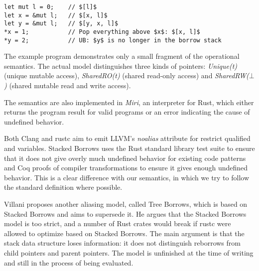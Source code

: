 \begin{code}
\begin{verbatim}
let mut l = 0;    // $[l]$
let x = &mut l;   // $[x, l]$
let y = &mut l;   // $[y, x, l]$
*x = 1;           // Pop everything above $x$: $[x, l]$
*y = 2;           // UB: $y$ is no longer in the borrow stack
\end{verbatim}
\end{code}    

The example program demonstrates only a small fragment of the operational semantics.
The actual model distinguishes three kinds of pointers: \textit{Unique(t)} (unique mutable access), \textit{SharedRO(t)} (shared read-only access)
and \textit{SharedRW($\bot$)} (shared mutable read and write access).

The semantics are also implemented in \textit{Miri}, an interpreter for Rust, which either returns
the program result for valid programs or an error indicating the cause of undefined behavior.

Both Clang and rustc aim to emit LLVM's \textit{noalias}
attribute for restrict qualified and  variables.
Stacked Borrows uses the Rust standard library test suite to ensure that it does not give overly much undefined behavior
for existing code patterns and Coq proofs of compiler transformations to ensure it gives enough undefined behavior.
This is a clear difference with our semantics, in which we try to follow the standard definition where possible.

Villani \cite{villani2023treeborrows} proposes another aliasing model, called Tree Borrows, which is based on Stacked Borrows and aims to supersede it.
He argues that the Stacked Borrows model is too strict, and a number of Rust crates would break if rustc
were allowed to optimize based on Stacked Borrows.
The main argument is that the stack data structure loses information:  it does not distinguish reborrows from child pointers and parent pointers.
The model is unfinished at the time of writing and still in the process of being evaluated.
